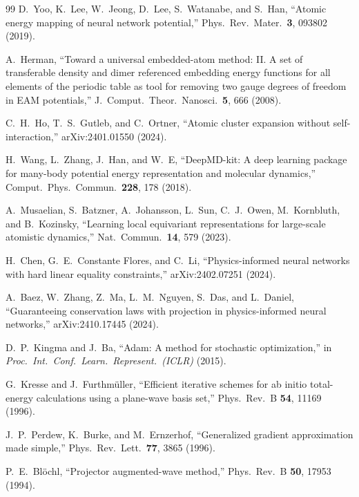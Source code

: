 \documentclass[twoside,prb,aps,floatfix,superscriptaddress,longbibliography]{revtex4-2}
\begin{document}
\begin{thebibliography}{99}
D.~Yoo, K.~Lee, W.~Jeong, D.~Lee, S.~Watanabe, and S.~Han, ``Atomic energy mapping of neural network potential,'' Phys.\ Rev.\ Mater.\ \textbf{3}, 093802 (2019).

A.~Herman, ``Toward a universal embedded-atom method: II. A set of transferable density and dimer referenced embedding energy functions for all elements of the periodic table as tool for removing two gauge degrees of freedom in EAM potentials,'' J.\ Comput.\ Theor.\ Nanosci.\ \textbf{5}, 666 (2008).

C.~H.~Ho, T.~S.~Gutleb, and C.~Ortner, ``Atomic cluster expansion without self-interaction,'' arXiv:2401.01550 (2024).

H.~Wang, L.~Zhang, J.~Han, and W.~E, ``DeepMD-kit: A deep learning package for many-body potential energy representation and molecular dynamics,'' Comput.\ Phys.\ Commun.\ \textbf{228}, 178 (2018).

A.~Musaelian, S.~Batzner, A.~Johansson, L.~Sun, C.~J.~Owen, M.~Kornbluth, and B.~Kozinsky, ``Learning local equivariant representations for large-scale atomistic dynamics,'' Nat.\ Commun.\ \textbf{14}, 579 (2023).

H.~Chen, G.~E.~Constante Flores, and C.~Li, ``Physics-informed neural networks with hard linear equality constraints,'' arXiv:2402.07251 (2024).

A.~Baez, W.~Zhang, Z.~Ma, L.~M.~Nguyen, S.~Das, and L.~Daniel, ``Guaranteeing conservation laws with projection in physics-informed neural networks,'' arXiv:2410.17445 (2024).

D.~P.~Kingma and J.~Ba, ``Adam: A method for stochastic optimization,'' in \textit{Proc.\ Int.\ Conf.\ Learn.\ Represent.\ (ICLR)} (2015).

G.~Kresse and J.~Furthm\"{u}ller, ``Efficient iterative schemes for ab initio total-energy calculations using a plane-wave basis set,'' Phys.\ Rev.\ B \textbf{54}, 11169 (1996).

J.~P.~Perdew, K.~Burke, and M.~Ernzerhof, ``Generalized gradient approximation made simple,'' Phys.\ Rev.\ Lett.\ \textbf{77}, 3865 (1996).

P.~E.~Bl\"{o}chl, ``Projector augmented-wave method,'' Phys.\ Rev.\ B \textbf{50}, 17953 (1994).

\end{thebibliography}
\end{document}
